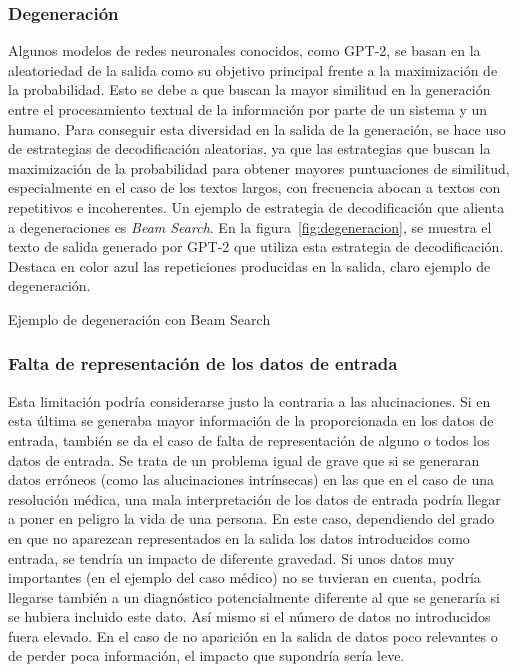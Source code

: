 \subsubsection{Degeneración}

Algunos modelos de redes neuronales conocidos, como GPT-2, se basan en la aleatoriedad de la salida como su objetivo principal frente a la maximización de la probabilidad. Esto se debe a que buscan la mayor similitud en la generación entre el procesamiento textual de la información por parte de un sistema y un humano. Para conseguir esta diversidad en la salida de la generación, se hace uso de estrategias de decodificación aleatorias, ya que las estrategias que buscan la maximización de la probabilidad para obtener mayores puntuaciones de similitud, especialmente en el caso de los textos largos, con frecuencia abocan a textos con repetitivos e incoherentes. Un ejemplo de estrategia de decodificación que alienta a degeneraciones es \textit{Beam Search}. En la figura~\ref{fig:degeneracion}, se muestra el texto de salida generado por GPT-2 que utiliza esta estrategia de decodificación. Destaca en color azul las repeticiones producidas en la salida, claro ejemplo de degeneración.

%
{Ejemplo de degeneración con Beam Search }

\subsubsection{Falta de representación de los datos de entrada}

Esta limitación podría considerarse justo la contraria a las alucinaciones. Si en esta última se generaba mayor información de la proporcionada en los datos de entrada, también se da el caso de falta de representación de alguno o todos los datos de entrada. Se trata de un problema igual de grave que si se generaran datos erróneos (como las alucinaciones intrínsecas) en las que en el caso de una resolución médica, una mala interpretación de los datos de entrada podría llegar a poner en peligro la vida de una persona. En este caso, dependiendo del grado en que no aparezcan representados en la salida los datos introducidos como entrada, se tendría un impacto de diferente gravedad. Si unos datos muy importantes (en el ejemplo del caso médico) no se tuvieran en cuenta, podría llegarse también a un diagnóstico potencialmente diferente al que se generaría si se hubiera incluido este dato. Así mismo si el número de datos no introducidos fuera elevado. En el caso de no aparición en la salida de datos poco relevantes o de perder poca información, el impacto que supondría sería leve.







